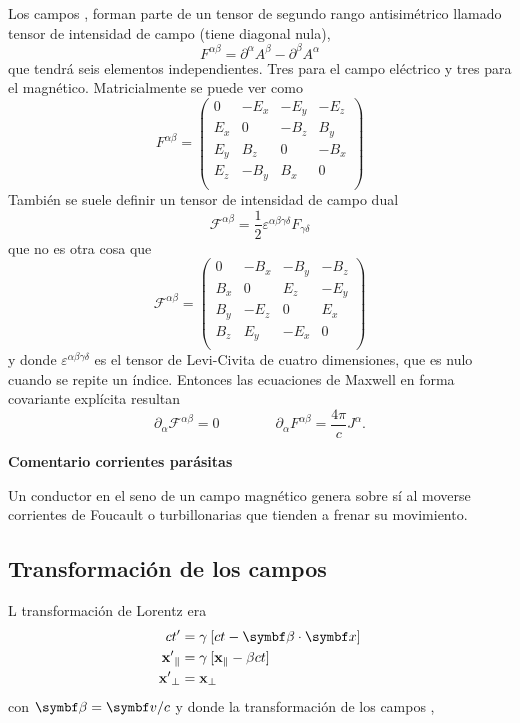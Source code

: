 \documentclass[10pt,oneside]{CBFT_book}
\begin{document}
Los campos ,  forman parte de un tensor de segundo rango antisimétrico llamado tensor
de intensidad de campo (tiene diagonal nula),
\[
	F^{\alpha\beta} = \partial^\alpha A^\beta - \partial^\beta A^\alpha
\]
que tendrá seis elementos independientes. Tres para el campo eléctrico y tres para el magnético.
Matricialmente se puede ver como 
\[
	F^{\alpha\beta} =
	\begin{pmatrix}
	 0 & -E_x & -E_y & -E_z \\
	 E_x & 0 & -B_z & B_y \\
	 E_y & B_z & 0 & -B_x \\
	 E_z & -B_y & B_x & 0 \\
	\end{pmatrix}
\]
También se suele definir un tensor de intensidad de campo dual
\[
	\mathcal{F}^{\alpha\beta} =  \frac{1}{2} \varepsilon^{\alpha\beta\gamma\delta} F_{\gamma\delta}
\]
que no es otra cosa que 
\[
	\mathcal{F}^{\alpha\beta}=
	\begin{pmatrix}
	 0 & -B_x & -B_y & -B_z \\
	 B_x & 0 & E_z & -E_y \\
	 B_y & -E_z & 0 & E_x \\
	 B_z & E_y & -E_x & 0 \\
	\end{pmatrix}
\]
y donde $\varepsilon^{\alpha\beta\gamma\delta}$ es el tensor de Levi-Civita de cuatro dimensiones, que es nulo
cuando se repite un índice.
Entonces las ecuaciones de Maxwell en forma covariante explícita resultan 
\[
	\partial_\alpha \mathcal{F}^{\alpha\beta} =  0 \qquad \qquad 
	\partial_\alpha F^{\alpha\beta} =  \frac{4 \pi}{c} J^\alpha.
\]

\begin{ejemplo}{\bf Comentario corrientes parásitas}

Un conductor en el seno de un campo magnético genera sobre sí al moverse corrientes
de Foucault o turbillonarias que tienden a frenar su movimiento.
 
\end{ejemplo}


\subsection{Transformación de los campos}

L transformación de Lorentz era 
\begin{align*}
	ct' &= \gamma \: [ ct - \pe{\beta}{x} ] \\
	\mathbf{x'}_\parallel &= \gamma \: [ \mathbf{x}_\parallel - {\beta}ct ] \\
	\mathbf{x'}_\perp &= \mathbf{x}_\perp
\end{align*}
con $\vb{\beta} = \vb{v}/c$ y donde la transformación de los campos , 
\end{document}
